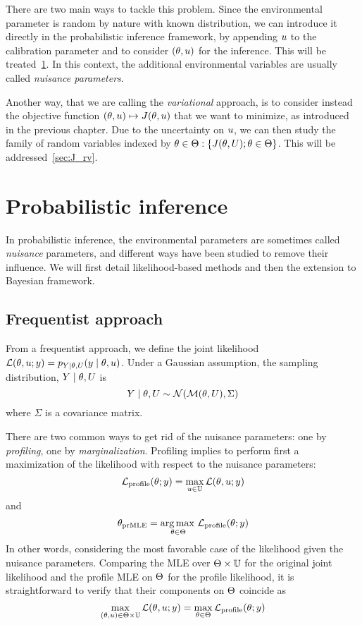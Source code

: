 \documentclass[../../Main_ManuscritThese.tex]{subfiles}
\begin{document}
There are two main ways to tackle this problem. Since the environmental parameter is random by nature with known distribution, we can introduce it directly in the probabilistic inference framework, by appending $u$ to the calibration parameter and to consider $(\theta, u)$ for the inference. This will be treated~\cref{sec:nuisance_parameters}. In this context, the additional environmental variables are usually called \emph{nuisance parameters}. 

Another way, that we are calling the \emph{variational} approach, is to consider instead the objective function $(\theta, u) \mapsto J(\theta, u)$ that we want to minimize, as introduced in the previous chapter. Due to the uncertainty on $u$, we can then study the family of random variables indexed by $\theta \in \Theta: \{J(\theta, U); \theta\in\Theta\}$. This will be addressed~\cref{sec:J_rv}.

\section{Probabilistic inference}
\label{sec:nuisance_parameters}
In probabilistic inference, the environmental parameters are sometimes called \emph{nuisance} parameters, and different ways have been studied to remove their influence.
We will first detail likelihood-based methods and then the extension to Bayesian framework.
\subsection{Frequentist approach}
From a frequentist approach, we define the joint likelihood $\mathcal{L}(\theta, u ;y) = p_{Y\mid \theta,U}(y \mid \theta, u)$.
Under a Gaussian assumption, the sampling distribution, $Y\mid \theta, U$ is 
\begin{equation}
Y \mid \theta, U \sim \mathcal{N}(\mathcal{M}(\theta, U), \Sigma)
\end{equation}
where $\Sigma$ is a covariance matrix.

There are two common ways to get rid of the nuisance parameters: one by \emph{profiling}, one by \emph{marginalization}.
Profiling implies to perform first a maximization of the likelihood with respect to the nuisance parameters:
\begin{equation}
  \label{eq:def_profile_lik}
  \mathcal{L}_{\mathrm{profile}}(\theta;y) = \max_{u \in \mathbb{U}} \mathcal{L}(\theta,u;y)
\end{equation}
and
\begin{equation}
  {\theta}_{\mathrm{prMLE}} = \operatorname*{arg\,max \,}_{\theta\in\Theta} \mathcal{L}_{\mathrm{profile}}(\theta;y)
\end{equation}
In other words, considering the most favorable case of the likelihood given the nuisance parameters.
Comparing the MLE over $\Theta \times \mathbb{U}$ for the original joint likelihood and the profile MLE on $\Theta$ for the profile likelihood, it is straightforward to verify that their components on $\Theta$ coincide as
\begin{equation}
  \max_{(\theta ,u) \in \Theta\times \mathbb{U}} \mathcal{L}(\theta,u;y) = \max_{\theta\in \Theta} \mathcal{L}_{\mathrm{profile}}(\theta;y)
\end{equation}
\end{document}
